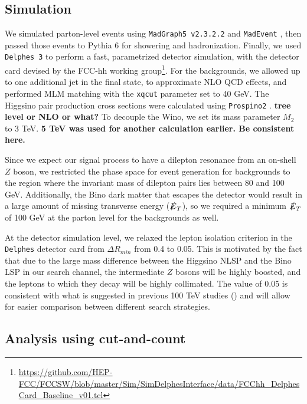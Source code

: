 \documentclass[a4paper,11pt]{article}
\newcommand{\Shufang}[1]{{\bf\color{Maroon}  #1}}
\newcommand{\met}{{\slashed{E}_T}}
\begin{document}
\subsection{Simulation}\label{simulation}

We simulated parton-level events using \texttt{MadGraph5 v2.3.2.2} and
\texttt{MadEvent} \citep{Alwall:2014hca}, then passed those events to Pythia 6
\citep{Sjostrand:2006za} for showering and hadronization. Finally, we used
\texttt{Delphes 3} \citep{deFavereau:2013fsa} to perform a fast, parametrized
detector simulation, with the detector card devised by the FCC-hh working
group\footnote{\url{https://github.com/HEP-FCC/FCCSW/blob/master/Sim/SimDelphesInterface/data/FCChh_DelphesCard_Baseline_v01.tcl}}.
For the backgrounds, we allowed up to one additional jet in the final state, to
approximate NLO QCD effects, and performed MLM matching with the \texttt{xqcut}
parameter set to 40 GeV. The Higgsino pair production cross sections were
calculated using \texttt{Prospino2} \citep{Beenakker:1999xh}. \Shufang{tree level or NLO or what?}  To decouple the
Wino, we set its mass parameter $M_2$ to 3 TeV.  \Shufang{5 TeV was used for another calculation earlier.  Be consistent here.}

Since we expect our signal process to have a dilepton resonance from an on-shell
$Z$ boson, we restricted the phase space for event generation for backgrounds to
the region where the invariant mass of dilepton pairs lies between 80 and 100
GeV. Additionally, the Bino dark matter that escapes the detector would result
in a large amount of missing transverse energy ($\met$), so we required
a minimum $\met$ of 100 GeV at the parton level for the backgrounds as
well. 

At the detector simulation level, we relaxed the lepton isolation criterion in the
\texttt{Delphes} detector card from $\Delta R_{min}$ from 0.4 to 0.05. This is
motivated by the fact that due to the large mass difference between the Higgsino
NLSP and the Bino LSP in our search channel, the intermediate $Z$ bosons will be
highly boosted, and the leptons to which they decay will be highly collimated.
The value of 0.05 is consistent with what is suggested in previous 100 TeV
studies (\citep{Acharya:2014pua,Gori:2014oua,Bramante:2014tba}) and will allow
for easier comparison between different search strategies.


\subsection{Analysis using cut-and-count}
\label{event-selection}
\end{document}
